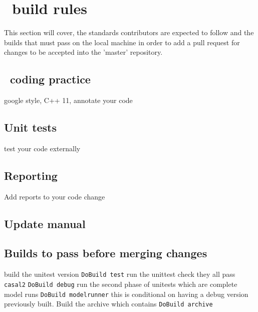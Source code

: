 \section{\CNAME\ build rules\label{sec:build_rules}}
This section will cover, the standards contributors are expected to follow and the builds that must pass on the local machine in order to add a pull request for changes to be accepted into the 'master' repository.

\subsection{\CNAME\ coding practice}
google style, C++ 11, annotate your code

\subsection{Unit tests}
test your code externally

\subsection{Reporting}
Add reports to your code change

\subsection{Update manual}

\subsection{Builds to pass before merging changes}
build the unitest version
\texttt{DoBuild test}
run the unittest check they all pass
\texttt{casal2}
\texttt{DoBuild debug}
run the second phase of unitests which are complete model runs
\texttt{DoBuild modelrunner}
this is conditional on having a debug version previously built.
Build the archive which contains
\texttt{DoBuild archive}



